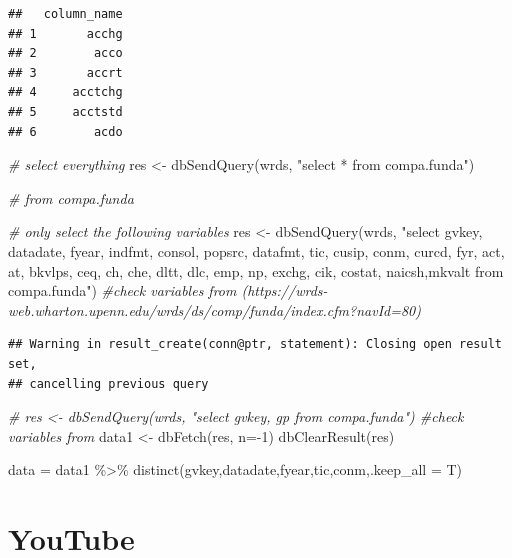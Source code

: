 \documentclass[
]{book}
\newenvironment{Shaded}{\begin{snugshade}}{\end{snugshade}}
\newcommand{\AttributeTok}[1]{\textcolor[rgb]{0.77,0.63,0.00}{#1}}
\newcommand{\CommentTok}[1]{\textcolor[rgb]{0.56,0.35,0.01}{\textit{#1}}}
\newcommand{\DecValTok}[1]{\textcolor[rgb]{0.00,0.00,0.81}{#1}}
\newcommand{\FunctionTok}[1]{\textcolor[rgb]{0.00,0.00,0.00}{#1}}
\newcommand{\NormalTok}[1]{#1}
\newcommand{\OtherTok}[1]{\textcolor[rgb]{0.56,0.35,0.01}{#1}}
\newcommand{\SpecialCharTok}[1]{\textcolor[rgb]{0.00,0.00,0.00}{#1}}
\newcommand{\StringTok}[1]{\textcolor[rgb]{0.31,0.60,0.02}{#1}}
\begin{document}
\begin{verbatim}
##   column_name
## 1       acchg
## 2        acco
## 3       accrt
## 4     acctchg
## 5     acctstd
## 6        acdo
\end{verbatim}

\begin{Shaded}
\begin{Highlighting}[]
\CommentTok{\# select everything}
\NormalTok{res }\OtherTok{\textless{}{-}} \FunctionTok{dbSendQuery}\NormalTok{(wrds, }\StringTok{"select * from compa.funda"}\NormalTok{)}

\CommentTok{\# from compa.funda}

\CommentTok{\# only select the following variables}
\NormalTok{res }\OtherTok{\textless{}{-}} \FunctionTok{dbSendQuery}\NormalTok{(wrds, }\StringTok{"select gvkey, datadate, fyear, indfmt, consol, popsrc, datafmt, tic, cusip, conm, curcd, fyr, act, at, bkvlps, ceq, ch, che, dltt, dlc, emp, np, exchg, cik, costat, naicsh,mkvalt from compa.funda"}\NormalTok{) }\CommentTok{\#check variables from (https://wrds{-}web.wharton.upenn.edu/wrds/ds/comp/funda/index.cfm?navId=80)}
\end{Highlighting}
\end{Shaded}

\begin{verbatim}
## Warning in result_create(conn@ptr, statement): Closing open result set,
## cancelling previous query
\end{verbatim}

\begin{Shaded}
\begin{Highlighting}[]
\CommentTok{\# res \textless{}{-} dbSendQuery(wrds, "select gvkey, gp from compa.funda") \#check variables from}
\NormalTok{data1 }\OtherTok{\textless{}{-}} \FunctionTok{dbFetch}\NormalTok{(res, }\AttributeTok{n=}\SpecialCharTok{{-}}\DecValTok{1}\NormalTok{)}
\FunctionTok{dbClearResult}\NormalTok{(res)}

\NormalTok{data }\OtherTok{=}\NormalTok{ data1 }\SpecialCharTok{\%\textgreater{}\%}
    \FunctionTok{distinct}\NormalTok{(gvkey,datadate,fyear,tic,conm,}\AttributeTok{.keep\_all =}\NormalTok{ T)}
\end{Highlighting}
\end{Shaded}

\hypertarget{youtube}{%
\section{YouTube}\label{youtube}}
\end{document}
